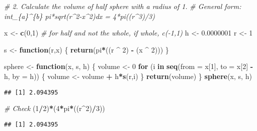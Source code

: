 \documentclass[]{article}
\newenvironment{Shaded}{\begin{snugshade}}{\end{snugshade}}
\newcommand{\KeywordTok}[1]{\textcolor[rgb]{0.13,0.29,0.53}{\textbf{#1}}}
\newcommand{\DataTypeTok}[1]{\textcolor[rgb]{0.13,0.29,0.53}{#1}}
\newcommand{\DecValTok}[1]{\textcolor[rgb]{0.00,0.00,0.81}{#1}}
\newcommand{\FloatTok}[1]{\textcolor[rgb]{0.00,0.00,0.81}{#1}}
\newcommand{\StringTok}[1]{\textcolor[rgb]{0.31,0.60,0.02}{#1}}
\newcommand{\CommentTok}[1]{\textcolor[rgb]{0.56,0.35,0.01}{\textit{#1}}}
\newcommand{\ControlFlowTok}[1]{\textcolor[rgb]{0.13,0.29,0.53}{\textbf{#1}}}
\newcommand{\OperatorTok}[1]{\textcolor[rgb]{0.81,0.36,0.00}{\textbf{#1}}}
\newcommand{\NormalTok}[1]{#1}
\begin{document}
\begin{Shaded}
\begin{Highlighting}[]
\CommentTok{# 2. Calculate the volume of half sphere with a radius of 1.}
\CommentTok{# General form: int_\{a\}^\{b\} pi*sqrt(r^2-x^2)dx = 4*pi((r^3)/3)}

\NormalTok{x <-}\StringTok{ }\KeywordTok{c}\NormalTok{(}\DecValTok{0}\NormalTok{,}\DecValTok{1}\NormalTok{) }\CommentTok{# for half and not the whole, if whole, c(-1,1)}
\NormalTok{h <-}\StringTok{ }\FloatTok{0.0000001}
\NormalTok{r <-}\StringTok{ }\DecValTok{1}

\NormalTok{s <-}\StringTok{ }\ControlFlowTok{function}\NormalTok{(r,x) \{}
  \KeywordTok{return}\NormalTok{(pi}\OperatorTok{*}\NormalTok{((r }\OperatorTok{^}\StringTok{ }\DecValTok{2}\NormalTok{) }\OperatorTok{-}\StringTok{ }\NormalTok{(x }\OperatorTok{^}\StringTok{ }\DecValTok{2}\NormalTok{)))}
\NormalTok{\}}

\NormalTok{sphere <-}\StringTok{ }\ControlFlowTok{function}\NormalTok{(x, s, h) \{}
\NormalTok{  volume <-}\StringTok{ }\DecValTok{0}
  \ControlFlowTok{for}\NormalTok{ (i }\ControlFlowTok{in} \KeywordTok{seq}\NormalTok{(}\DataTypeTok{from =}\NormalTok{ x[}\DecValTok{1}\NormalTok{], }\DataTypeTok{to =}\NormalTok{ x[}\DecValTok{2}\NormalTok{] }\OperatorTok{-}\StringTok{ }\NormalTok{h, }\DataTypeTok{by =}\NormalTok{ h)) \{}
\NormalTok{    volume <-}\StringTok{ }\NormalTok{volume }\OperatorTok{+}\StringTok{ }\NormalTok{h}\OperatorTok{*}\KeywordTok{s}\NormalTok{(r,i)}
\NormalTok{  \}}
  \KeywordTok{return}\NormalTok{(volume)}
\NormalTok{\}}
\KeywordTok{sphere}\NormalTok{(x, s, h)}
\end{Highlighting}
\end{Shaded}

\begin{verbatim}
## [1] 2.094395
\end{verbatim}

\begin{Shaded}
\begin{Highlighting}[]
\CommentTok{# Check}
\NormalTok{(}\DecValTok{1}\OperatorTok{/}\DecValTok{2}\NormalTok{)}\OperatorTok{*}\NormalTok{(}\DecValTok{4}\OperatorTok{*}\NormalTok{pi}\OperatorTok{*}\NormalTok{((r}\OperatorTok{^}\DecValTok{2}\NormalTok{)}\OperatorTok{/}\DecValTok{3}\NormalTok{))}
\end{Highlighting}
\end{Shaded}

\begin{verbatim}
## [1] 2.094395
\end{verbatim}
\end{document}
